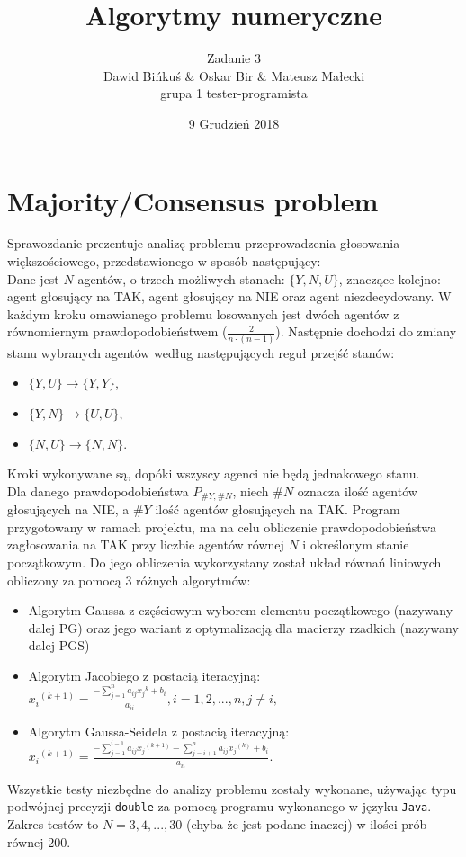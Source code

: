 \documentclass[10pt]{article}
\title{Algorytmy numeryczne}
\author{Zadanie 3 \\ Dawid Bińkuś \& Oskar Bir \& Mateusz Małecki\\grupa 1 tester-programista}
\date{9 Grudzień 2018}
\begin{document}
\maketitle 

\section{Majority/Consensus problem}
Sprawozdanie prezentuje analizę problemu przeprowadzenia głosowania większościowego, przedstawionego w sposób następujący:\\
Dane jest $N$ agentów, o trzech możliwych stanach: $\{Y,N,U\}$, znaczące kolejno: agent głosujący na TAK, agent głosujący na NIE oraz agent niezdecydowany.
W każdym kroku omawianego problemu losowanych jest dwóch agentów z równomiernym prawdopodobieństwem ($\frac{2}{n\cdot (n-1)}$). Następnie dochodzi do zmiany stanu wybranych agentów według następujących reguł przejść stanów:
\begin{itemize}
	\item $\{Y,U\} \to \{Y,Y\}$,
	\item $\{Y,N\} \to \{U,U\}$,
	\item $\{N,U\} \to \{N,N\}$.
\end{itemize}
Kroki wykonywane są, dopóki wszyscy agenci nie będą jednakowego stanu.
\\
Dla danego prawdopodobieństwa $P_{\#Y,\#N}$, niech $\#N$ oznacza ilość agentów głosujących na NIE, a $\#Y$ ilość agentów głosujących na TAK.
Program przygotowany w ramach projektu, ma na celu obliczenie prawdopodobieństwa zagłosowania na TAK przy liczbie agentów równej $N$ i określonym stanie początkowym. Do jego obliczenia wykorzystany został układ równań liniowych obliczony za pomocą 3 różnych algorytmów:
\begin{itemize}
	\item Algorytm Gaussa z częściowym wyborem elementu początkowego (nazywany dalej PG) oraz jego wariant z optymalizacją dla macierzy rzadkich (nazywany dalej PGS)
	\item Algorytm Jacobiego z postacią iteracyjną:
	${x_{i}}^{(k+1)}=\frac{-\sum_{j=1}^{n}a_{ij}{x_j}^{k}+b_i}{a_{ii}}, i=1,2,...,n,  j\neq i,$
	\item Algorytm Gaussa-Seidela z postacią iteracyjną:
	${x_{i}}^{(k+1)}=\frac{-\sum_{j=1}^{i-1}a_{ij}{x_j}^{(k+1)}-\sum_{j=i+1}^{n}a_{ij}{x_j}^{(k)}+b_i}{a_{ii}}.$
\end{itemize}
Wszystkie testy niezbędne do analizy problemu zostały wykonane, używając typu podwójnej precyzji \texttt{double} za pomocą programu wykonanego w języku \texttt{Java}.
Zakres testów to $N = 3,4,...,30$ (chyba że jest podane inaczej) w ilości prób równej $200$.
\end{document}
